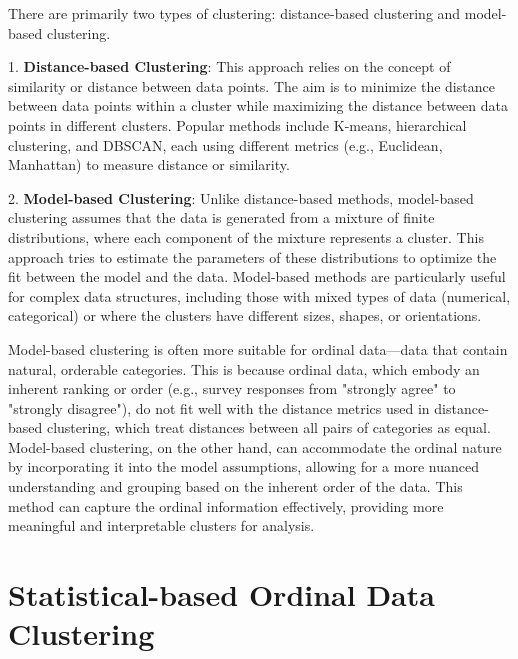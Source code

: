 \documentclass{article}
\begin{document}
There are primarily two types of clustering: distance-based clustering and model-based clustering.

1. \textbf{Distance-based Clustering}: This approach relies on the concept of similarity or distance between data points. The aim is to minimize the distance between data points within a cluster while maximizing the distance between data points in different clusters. Popular methods include K-means, hierarchical clustering, and DBSCAN, each using different metrics (e.g., Euclidean, Manhattan) to measure distance or similarity.

2. \textbf{Model-based Clustering}: Unlike distance-based methods, model-based clustering assumes that the data is generated from a mixture of finite distributions, where each component of the mixture represents a cluster. This approach tries to estimate the parameters of these distributions to optimize the fit between the model and the data. Model-based methods are particularly useful for complex data structures, including those with mixed types of data (numerical, categorical) or where the clusters have different sizes, shapes, or orientations.

Model-based clustering is often more suitable for ordinal data—data that contain natural, orderable categories. This is because ordinal data, which embody an inherent ranking or order (e.g., survey responses from "strongly agree" to "strongly disagree"), do not fit well with the distance metrics used in distance-based clustering, which treat distances between all pairs of categories as equal. Model-based clustering, on the other hand, can accommodate the ordinal nature by incorporating it into the model assumptions, allowing for a more nuanced understanding and grouping based on the inherent order of the data. This method can capture the ordinal information effectively, providing more meaningful and interpretable clusters for analysis.



\section{Statistical-based Ordinal Data Clustering}
\end{document}
